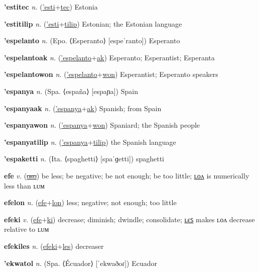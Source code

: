 \textbf{\hypertarget{'estitec}{'estitec}} \textit{n.} (\hyperlink{'esti}{'esti}+\allowbreak \hyperlink{tec}{tec})
Estonia

\textbf{\hypertarget{'estitilip}{'estitilip}} \textit{n.} (\hyperlink{'esti}{'esti}+\allowbreak \hyperlink{tilip}{tilip})
Estonian; the Estonian language

\textbf{\hypertarget{'espelanto}{'espelanto}} \textit{n.} (Epo. ⟨Esperanto⟩ [espeˈranto])
Esperanto

\textbf{\hypertarget{'espelantoak}{'espelantoak}} \textit{n.} (\hyperlink{'espelanto}{'espelanto}+\allowbreak \hyperlink{ak}{ak})
Esperanto; Esperantist; Esperanta

\textbf{\hypertarget{'espelantowon}{'espelantowon}} \textit{n.} (\hyperlink{'espelanto}{'espelanto}+\allowbreak \hyperlink{won}{won})
Esperantist; Esperanto speakers

\textbf{\hypertarget{'espanya}{'espanya}} \textit{n.} (Spa. ⟨españa⟩ [espaɲa])
Spain

\textbf{\hypertarget{'espanyaak}{'espanyaak}} \textit{n.} (\hyperlink{'espanya}{'espanya}+\allowbreak \hyperlink{ak}{ak})
Spanish; from Spain

\textbf{\hypertarget{'espanyawon}{'espanyawon}} \textit{n.} (\hyperlink{'espanya}{'espanya}+\allowbreak \hyperlink{won}{won})
Spaniard; the Spanish people

\textbf{\hypertarget{'espanyatilip}{'espanyatilip}} \textit{n.} (\hyperlink{'espanya}{'espanya}+\allowbreak \hyperlink{tilip}{tilip})
the Spanish language

\textbf{\hypertarget{'espaketti}{'espaketti}} \textit{n.} (Ita. ⟨spaghetti⟩ [spaˈɡetti])
spaghetti

\textbf{\hypertarget{efe}{efe}} \textit{v.} (\hyperlink{oso}{\sout{oso}})
be less; be negative; be not enough; be too little; \hyperlink{efelon}{ʟᴏᴧ} is numerically less than ʟᴜᴍ

\textbf{\hypertarget{efelon}{efelon}} \textit{n.} (\hyperlink{efe}{efe}+\allowbreak \hyperlink{lon}{lon})
less; negative; not enough; too little

\textbf{\hypertarget{efeki}{efeki}} \textit{v.} (\hyperlink{efe}{efe}+\allowbreak \hyperlink{ki}{ki})
decrease; diminish; dwindle; consolidate; \hyperlink{efekiles}{ʟєꜱ} makes ʟᴏᴧ decrease relative to ʟᴜᴍ

\textbf{\hypertarget{efekiles}{efekiles}} \textit{n.} (\hyperlink{efeki}{efeki}+\allowbreak \hyperlink{les}{les})
decreaser

\textbf{\hypertarget{'ekwatol}{'ekwatol}} \textit{n.} (Spa. ⟨Écuador⟩ [ˈekwaðoɾ])
Ecuador

